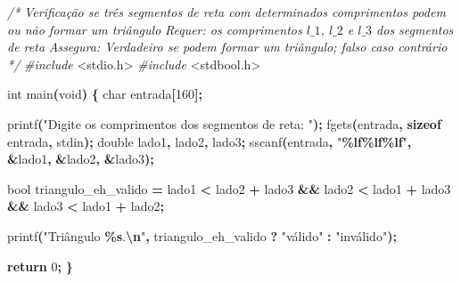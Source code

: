 \documentclass[
  11pt,
  a4paper,
]{scrbook}
\newenvironment{Shaded}{\begin{snugshade}}{\end{snugshade}}
\newcommand{\CommentTok}[1]{\textcolor[rgb]{0.56,0.35,0.01}{\textit{#1}}}
\newcommand{\ControlFlowTok}[1]{\textcolor[rgb]{0.13,0.29,0.53}{\textbf{#1}}}
\newcommand{\DataTypeTok}[1]{\textcolor[rgb]{0.13,0.29,0.53}{#1}}
\newcommand{\DecValTok}[1]{\textcolor[rgb]{0.00,0.00,0.81}{#1}}
\newcommand{\ImportTok}[1]{#1}
\newcommand{\KeywordTok}[1]{\textcolor[rgb]{0.13,0.29,0.53}{\textbf{#1}}}
\newcommand{\NormalTok}[1]{#1}
\newcommand{\OperatorTok}[1]{\textcolor[rgb]{0.81,0.36,0.00}{\textbf{#1}}}
\newcommand{\PreprocessorTok}[1]{\textcolor[rgb]{0.56,0.35,0.01}{\textit{#1}}}
\newcommand{\SpecialCharTok}[1]{\textcolor[rgb]{0.81,0.36,0.00}{\textbf{#1}}}
\newcommand{\StringTok}[1]{\textcolor[rgb]{0.31,0.60,0.02}{#1}}
\begin{document}
\begin{Shaded}
\begin{Highlighting}[]
\CommentTok{/*}
\CommentTok{Verificação se três segmentos de reta com determinados comprimentos podem}
\CommentTok{    ou não formar um triângulo}
\CommentTok{Requer: os comprimentos $l\_1$, $l\_2$ e $l\_3$ dos segmentos de reta}
\CommentTok{Assegura: Verdadeiro se podem formar um triângulo; falso caso contrário}
\CommentTok{*/}
\PreprocessorTok{\#include }\ImportTok{\textless{}stdio.h\textgreater{}}
\PreprocessorTok{\#include }\ImportTok{\textless{}stdbool.h\textgreater{}}

\DataTypeTok{int}\NormalTok{ main}\OperatorTok{(}\DataTypeTok{void}\OperatorTok{)} \OperatorTok{\{}
    \DataTypeTok{char}\NormalTok{ entrada}\OperatorTok{[}\DecValTok{160}\OperatorTok{];}

\NormalTok{    printf}\OperatorTok{(}\StringTok{"Digite os comprimentos dos segmentos de reta: "}\OperatorTok{);}
\NormalTok{    fgets}\OperatorTok{(}\NormalTok{entrada}\OperatorTok{,} \KeywordTok{sizeof}\NormalTok{ entrada}\OperatorTok{,}\NormalTok{ stdin}\OperatorTok{);}
    \DataTypeTok{double}\NormalTok{ lado1}\OperatorTok{,}\NormalTok{ lado2}\OperatorTok{,}\NormalTok{ lado3}\OperatorTok{;}
\NormalTok{    sscanf}\OperatorTok{(}\NormalTok{entrada}\OperatorTok{,} \StringTok{"}\SpecialCharTok{\%lf\%lf\%lf}\StringTok{"}\OperatorTok{,} \OperatorTok{\&}\NormalTok{lado1}\OperatorTok{,} \OperatorTok{\&}\NormalTok{lado2}\OperatorTok{,} \OperatorTok{\&}\NormalTok{lado3}\OperatorTok{);}

    \DataTypeTok{bool}\NormalTok{ triangulo\_eh\_valido }\OperatorTok{=}\NormalTok{ lado1 }\OperatorTok{\textless{}}\NormalTok{ lado2 }\OperatorTok{+}\NormalTok{ lado3 }\OperatorTok{\&\&}\NormalTok{ lado2 }\OperatorTok{\textless{}}\NormalTok{ lado1 }\OperatorTok{+}\NormalTok{ lado3 }\OperatorTok{\&\&}
\NormalTok{            lado3 }\OperatorTok{\textless{}}\NormalTok{ lado1 }\OperatorTok{+}\NormalTok{ lado2}\OperatorTok{;}

\NormalTok{    printf}\OperatorTok{(}\StringTok{"Triângulo }\SpecialCharTok{\%s}\StringTok{.}\SpecialCharTok{\textbackslash{}n}\StringTok{"}\OperatorTok{,}\NormalTok{ triangulo\_eh\_valido }\OperatorTok{?} \StringTok{"válido"} \OperatorTok{:} \StringTok{"inválido"}\OperatorTok{);}

    \ControlFlowTok{return} \DecValTok{0}\OperatorTok{;}
\OperatorTok{\}}
\end{Highlighting}
\end{Shaded}
\end{document}
